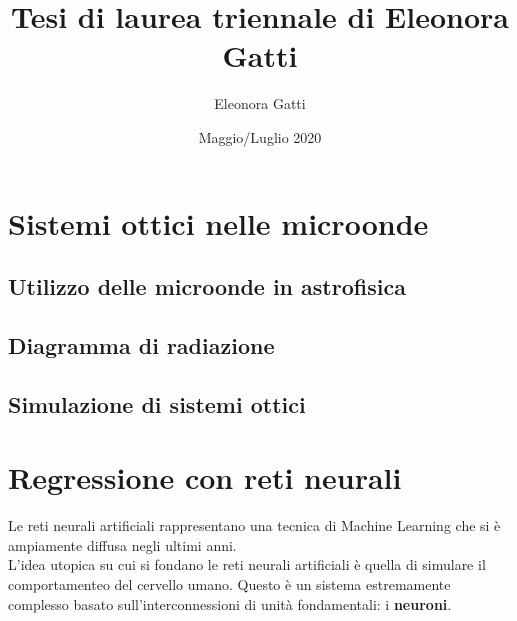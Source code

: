 \documentclass[11pt]{report}
\title{Tesi di laurea triennale di Eleonora Gatti}
\author{Eleonora Gatti}
\date{Maggio/Luglio 2020}
\begin{document}


\newpage
\thispagestyle{empty}
\clearpage\mbox{}\clearpage
\newpage
\thispagestyle{empty}


\tableofcontents
\newpage


\chapter{Sistemi ottici nelle microonde}\label{intro_sistemi_ottici}


\section{Utilizzo delle microonde in astrofisica}\label{microonde_astrofisica}


\section{Diagramma di radiazione}\label{rad_pattern}


\section{Simulazione di sistemi ottici}\label{simulazioni}





\chapter{Regressione con reti neurali}\label{reg_nn}
Le reti neurali artificiali rappresentano una tecnica di Machine Learning che si è ampiamente diffusa negli ultimi anni. \\
L'idea utopica su cui si fondano le reti neurali artificiali è quella di simulare il comportamenteo del cervello umano. Questo è un sistema estremamente complesso basato sull'interconnessioni di unità fondamentali: i \textbf {neuroni}. \\
\end{document}
